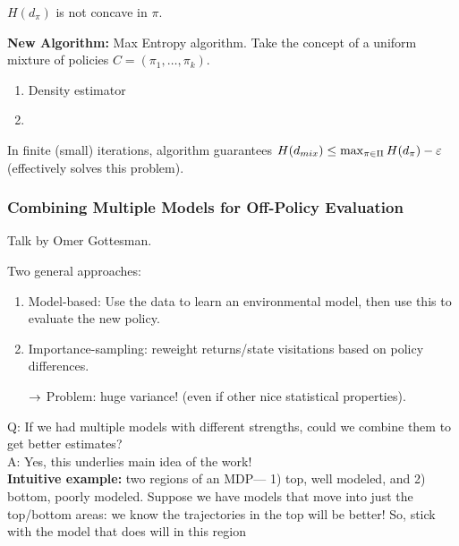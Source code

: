  \begin{proposition}
 $H(d_\pi)$ is not concave in $\pi$.
 \end{proposition}
 
 {\bf New Algorithm:} Max Entropy algorithm. Take the concept of a uniform mixture of policies $C = (\pi_1, \ldots, \pi_k)$.
 \begin{enumerate}
     \item Density estimator
     \item 
 \end{enumerate}
 
 \begin{theorem}
 In finite (small) iterations, algorithm guarantees $H(d_{mix}) \leq \max_{\pi \in \Pi}H(d_\pi) -\varepsilon$ (effectively solves this problem).
 \end{theorem}
 
 \spacerule
 \subsubsection{Combining Multiple Models for Off-Policy Evaluation~\cite{gottesman2019combining}}
 
 Talk by Omer Gottesman. \\
 
 
 Two general approaches:
 \begin{enumerate}
     \item Model-based: Use the data to learn an environmental model, then use this to evaluate the new policy.
     \item Importance-sampling: reweight returns/state visitations based on policy differences.
     
     $\rightarrow$ Problem: huge variance! (even if other nice statistical properties).
 \end{enumerate}
 
 Q: If we had multiple models with different strengths, could we combine them to get better estimates? \\
 
 A: Yes, this underlies main idea of the work! \\
 
 {\bf Intuitive example:} two regions of an MDP--- 1) top, well modeled, and 2) bottom, poorly modeled. Suppose we have models that move into just the top/bottom areas: we know the trajectories in the top will be better! So, stick with the model that does will in this region \\
 
